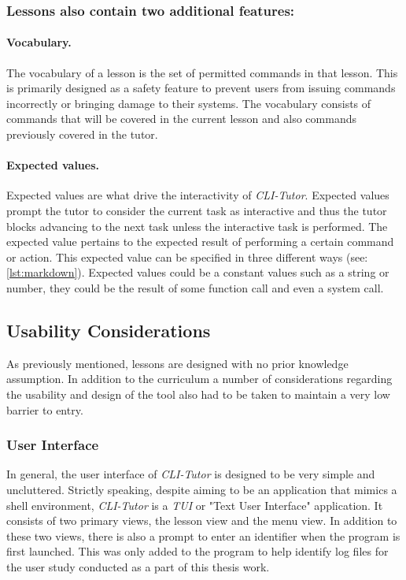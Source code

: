 \subsubsection{Lessons also contain two additional features:}

\paragraph{Vocabulary.}  The vocabulary of a lesson is the set of permitted
commands in that lesson. This is primarily designed as a safety feature to
prevent users from issuing commands incorrectly or bringing damage to their
systems. The vocabulary consists of commands that will be covered in the
current lesson and also commands previously covered in the tutor.

\paragraph{Expected values.} Expected values are what drive the interactivity
of \textit{CLI-Tutor}. Expected values prompt the tutor to consider the current
task as interactive and thus the tutor blocks advancing to the next task unless
the interactive task is performed. The expected value pertains to the expected
result of performing a certain command or action. This expected value can be
specified in three different ways (see: \autoref{lst:markdown}). Expected values could be a constant values such
as a string or number, they could be the result of some function call and even
a system call.

\subsection{Usability Considerations}

As previously mentioned, lessons are designed with no prior knowledge
assumption. In addition to the curriculum a number of considerations regarding
the usability and design of the tool also had to be taken to
maintain a very low barrier to entry.

\subsubsection{User Interface}
In general, the user interface of \textit{CLI-Tutor} is designed to be very
simple and uncluttered. Strictly speaking, despite aiming to be an application
that mimics a shell environment, \textit{CLI-Tutor} is a \textit{TUI} or "Text
User Interface" application. It consists of two primary views, the lesson view
and the menu view. In addition to these two views, there is also a prompt to
enter an identifier when the program is first launched. This was only added to
the program to help identify log files for the user study conducted as a part
of this thesis work.

